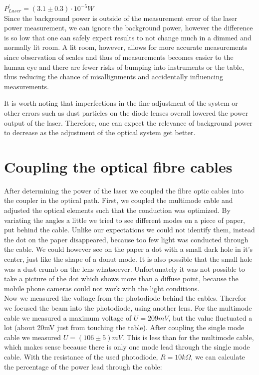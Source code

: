 \documentclass{article}
\begin{document}
$P^{'}_{Laser} = (3.1\pm 0.3) \cdot 10^{-5} W$\\

Since the background power is outside of the measurement error of
the laser power measurement, we can ignore the background power, however the difference is so low that one can safely expect results to not change much in a dimmed and normally lit room. A lit room, however, allows for more accurate measurements since observation of scales and thus of measurements becomes easier to the human eye and there are fewer risks of bumping into instruments or the table, thus reducing the chance of misallignments and accidentally influencing measurements.

It is worth noting that imperfections in the fine adjustment of the system or other errors such as dust particles on the diode lenses overall lowered the power output of the laser. Therefore, one can expect the relevance of background power to decrease as the adjustment of the optical system get better.


\section{Coupling the optical fibre cables}

After determining the power of the laser we coupled the fibre optic cables into the coupler in the optical path. First, we coupled the multimode cable and adjusted the optical elements such that the conduction was optimized. By variating the angles a little we tried to see different modes on a piece of paper, put behind the cable. Unlike our expectations we could not identify them, instead the dot on the paper disappeared, because too few light was conducted through the cable. We could however see on the paper a dot with a small dark hole in it's center, just like the shape of a donut mode. It is also possible that the small hole was a dust crumb on the lens whatsoever. Unfortunately it was not possible to take a picture of the dot which shows more than a diffuse point, because the mobile phone cameras could not work with the light conditions.\\

Now we measured the voltage from the photodiode behind the cables. Therefor we focused the beam into the photodiode, using another lens. For the multimode cable we measured a maximum voltage of $U=209mV$, but the value fluctuated a lot (about 20mV just from touching the table). After coupling the single mode cable we measured $U=(106 \pm 5)mV$. This is less than for the multimode cable, which makes sense because there is only one mode lead through the single mode cable. With the resistance of the used photodiode, $R = 10k\Omega$, we can calculate the percentage of the power lead through the cable:\\
\end{document}
